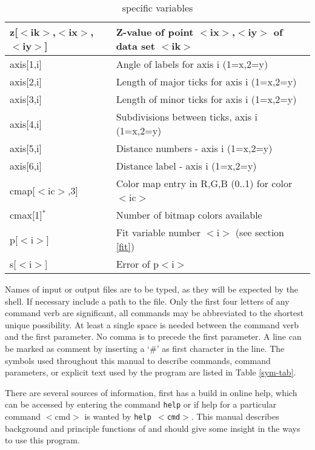 \begin{table}[!tb]
\begin{tabularx}{\textwidth}{|p{40mm}|X|}
   z[$<$ik$>$,$<$ix$>$,$<$iy$>$] &
                          Z-value of point $<$ix$>$,$<$iy$>$ of
                          data set $<$ik$>$\\
  \hline
  axis[1,i]       & Angle of labels for axis i (1=x,2=y) \\
  axis[2,i]       & Length of major ticks for axis i (1=x,2=y)\\
  axis[3,i]       & Length of minor ticks for axis i (1=x,2=y)\\
  axis[4,i]       & Subdivisions between ticks, axis i (1=x,2=y)\\
  axis[5,i]       & Distance numbers - axis i (1=x,2=y)\\
  axis[6,i]       & Distance label - axis i (1=x,2=y)\\
  \hline
  cmap[$<$ic$>$,3]    & Color map entry in R,G,B (0..1) for color $<$ic$>$ \\
  cmax[1]$^{*}$       & Number of bitmap colors available \\
  \hline
  p[$<$i$>$]          & Fit variable number $<$i$>$ (see section \ref{fit}) \\
  s[$<$i$>$]          & Error of p$<$i$>$ \\
  \hline
\end{tabularx}
\caption{\label{v1-tab}\Kuplot specific variables}
\end{table}

Names of input or output files are to be typed, as
they will be expected by the shell.  If necessary include a path to
the file.  Only the first four letters of any command verb are
significant, all commands may be abbreviated to the shortest unique
possibility.  At least a single space is needed between the command
verb and the first parameter.  No comma is to precede the first
parameter. A line can be marked as comment by inserting a `\#' as
first character in the line. The symbols used throughout this manual
to describe commands, command parameters, or explicit text used by
the program \Kuplot are listed in Table \ref{sym-tab}. \par

There are several sources of information, first \Kuplot has a
build in online help, which can be accessed by entering the command
{\tt help} or if help for a particular command $<$cmd$>$ is wanted
by {\tt help $<$cmd$>$}.  This manual describes background and
principle functions of \Kuplot and should give some insight in
the ways to use this program. \par

